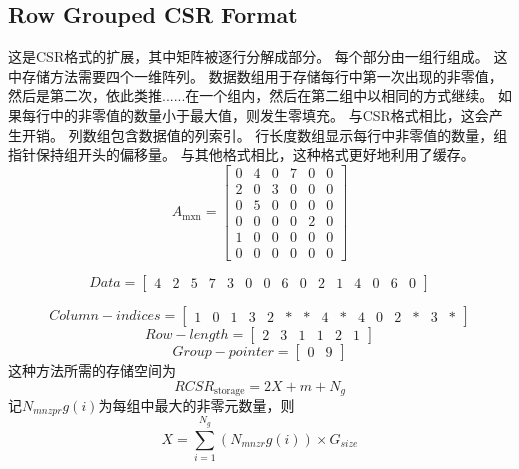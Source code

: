 \documentclass[forprint]{WHUBachelor}
\begin{document}
\subsection{Row Grouped CSR Format}
这是CSR格式的扩展，其中矩阵被逐行分解成部分\cite{Heller2015Adaptive}。 每个部分由一组行组成。 这中存储方法需要四个一维阵列。 数据数组用于存储每行中第一次出现的非零值，然后是第二次，依此类推......在一个组内，然后在第二组中以相同的方式继续。 如果每行中的非零值的数量小于最大值，则发生零填充。 与CSR格式相比，这会产生开销。 列数组包含数据值的列索引。 行长度数组显示每行中非零值的数量，组指针保持组开头的偏移量。 与其他格式相比，这种格式更好地利用了缓存。
\begin{equation} 
A_{\operatorname{mxn}}=\left[ \begin{array}{cccccc}{0} & {4} & {0} & {7} & {0} & {0} \\ {2} & {0} & {3} & {0} & {0} & {0} \\ {0} & {5} & {0} & {0} & {0} & {0} \\ {0} & {0} & {0} & {0} & {2} & {0} \\ {1} & {0} & {0} & {0} & {0} & {0} \\ {0} & {0} & {0} & {0} & {0} & {0}\end{array}\right]
 \end{equation}

\begin{equation} 
Data=\left[ \begin{array}{ccccccccccccccc}{4} & {2} & {5} & {7} & {3} & {0} & {0} & {6} & {0} & {2} & {1} & {4} & {0} & {6} & {0}\end{array}\right]
 \end{equation}

\begin{equation} 
Column-indices=\left[ \begin{array}{lllllllllllllll}{1} & {0} & {1} & {3} & {2} & {*} & {*} & {4} & {*} & {4} & {0} & {2} & {*} & {3} & {*}\end{array}\right]
 \end{equation}
\begin{equation} 
Row-length=\left[ \begin{array}{llllll}{2} & {3} & {1} & {1} & {2} & {1}\end{array}\right]
 \end{equation}
\begin{equation} 
Group-pointer=\left[ \begin{array}{ll}{0} & {9}\end{array}\right]
 \end{equation}
这种方法所需的存储空间为
\begin{equation} 
R C S R_{\text {storage}}=2 X+m+N_{g}
 \end{equation}
记$N_{mnzpr}g(i)$为每组中最大的非零元数量，则
\begin{equation} 
X=\sum_{i=1}^{N_{g}}\left(N_{m n z r} g(i)\right) \times G_{s i z e}
 \end{equation}
\end{document}
